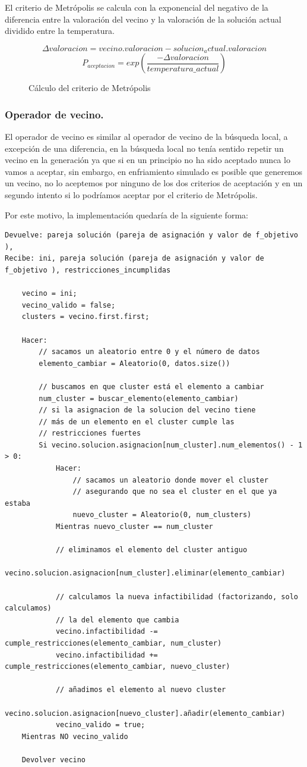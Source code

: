 \documentclass[12pt, spanish]{article}
\begin{document}
El criterio de Metrópolis se calcula con la exponencial del negativo de la diferencia entre la valoración del vecino y la valoración de la solución actual dividido entre la temperatura.

\begin{figure}[H]
	\centering
	$$ \Delta valoracion = vecino.valoracion - solucion_actual.valoracion $$
	$$ P_{aceptacion} = exp(\frac{- \Delta valoracion}{temperatura\_actual}) $$
	\caption{Cálculo del criterio de Metrópolis }
	\label{cMetropolis}
\end{figure}


\subsubsection{Operador de vecino.}

El operador de vecino es similar al operador de vecino de la búsqueda local, a excepción de una diferencia, en la búsqueda local no tenía sentido repetir un vecino en la generación ya que si en un principio no ha sido aceptado nunca lo vamos a aceptar, sin embargo, en enfriamiento simulado es posible que generemos un vecino, no lo aceptemos por ninguno de los dos criterios de aceptación y en un segundo intento si lo podríamos aceptar por el criterio de Metrópolis.

Por este motivo, la implementación quedaría de la siguiente forma:

\begin{lstlisting}
Devuelve: pareja solución (pareja de asignación y valor de f_objetivo ), 
Recibe: ini, pareja solución (pareja de asignación y valor de f_objetivo ), restricciones_incumplidas

	vecino = ini;
	vecino_valido = false;
	clusters = vecino.first.first;
	
	Hacer:
		// sacamos un aleatorio entre 0 y el número de datos
		elemento_cambiar = Aleatorio(0, datos.size())
	
		// buscamos en que cluster está el elemento a cambiar
		num_cluster = buscar_elemento(elemento_cambiar)
		// si la asignacion de la solucion del vecino tiene 
		// más de un elemento en el cluster cumple las
		// restricciones fuertes
		Si vecino.solucion.asignacion[num_cluster].num_elementos() - 1 > 0:
			Hacer:
				// sacamos un aleatorio donde mover el cluster
				// asegurando que no sea el cluster en el que ya estaba
				nuevo_cluster = Aleatorio(0, num_clusters)
			Mientras nuevo_cluster == num_cluster
			
			// eliminamos el elemento del cluster antiguo
			vecino.solucion.asignacion[num_cluster].eliminar(elemento_cambiar)
			
			// calculamos la nueva infactibilidad (factorizando, solo calculamos)
			// la del elemento que cambia
			vecino.infactibilidad -= cumple_restricciones(elemento_cambiar, num_cluster)
			vecino.infactibilidad += cumple_restricciones(elemento_cambiar, nuevo_cluster)
			
			// añadimos el elemento al nuevo cluster
			vecino.solucion.asignacion[nuevo_cluster].añadir(elemento_cambiar)
			vecino_valido = true;	
	Mientras NO vecino_valido
	
	Devolver vecino
\end{lstlisting}
\end{document}
